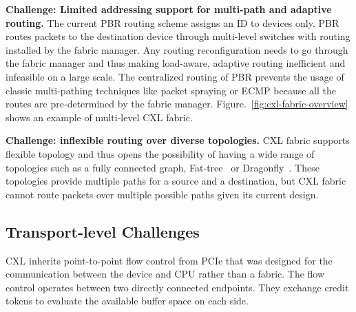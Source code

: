 \noindent \textbf{Challenge: Limited addressing support for multi-path and adaptive routing.}
%
%
The current PBR routing scheme assigns an ID to devices only. 
%
PBR routes packets to the destination device through multi-level switches with routing installed by the fabric manager. 
%
Any routing reconfiguration needs to go through the fabric manager and thus making load-aware, adaptive routing inefficient and infeasible on a large scale.
%
The centralized routing of PBR prevents the usage of classic multi-pathing techniques like packet spraying or ECMP because all the routes are pre-determined by the fabric manager.
%
Figure.~\ref{fig:cxl-fabric-overview} shows an example of multi-level CXL fabric.     
%
%
%

\noindent \textbf{Challenge: inflexible routing over diverse topologies.}
CXL fabric supports flexible topology and thus opens the possibility of having a wide range of topologies such as a fully connected graph, Fat-tree~\cite{fat-tree:sigcomm:2008} or Dragonfly~\cite{dragonfly:isca:2008}. 
%
These topologies provide multiple paths for a source and a destination, but CXL fabric cannot route packets over multiple possible paths given its current design.

\subsection{Transport-level Challenges}
\label{aurelia:sec:motivation:transport}

CXL inherits point-to-point flow control from PCIe that was designed for the communication between the device and CPU rather than a fabric. 
%
The flow control operates between two directly connected endpoints. 
%
They exchange credit tokens to evaluate the available buffer space on each side. 
%


